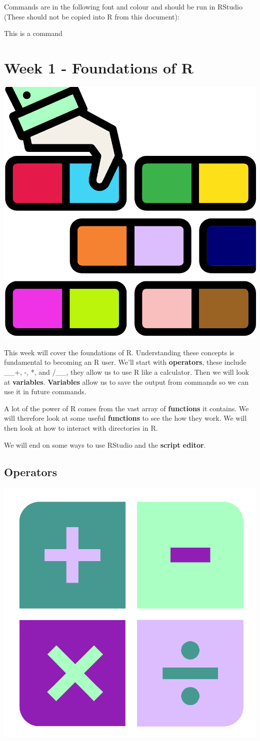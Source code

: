 \documentclass[]{book}
\newenvironment{Shaded}{\begin{snugshade}}{\end{snugshade}}
\newcommand{\NormalTok}[1]{#1}
\begin{document}
Commands are in the following font and colour and should be run in
RStudio (These should not be copied into R from this document):

\begin{Shaded}
\begin{Highlighting}[]
\NormalTok{This is a command }
\end{Highlighting}
\end{Shaded}

\chapter{Week 1 - Foundations of R}\label{week-1---foundations-of-r}

\begin{center}\includegraphics[width=0.2\linewidth]{figures/foundational} \end{center}

This week will cover the foundations of R. Understanding these concepts
is fundamental to becoming an R user. We'll start with
\textbf{operators}, these include \_\_+, -, *, and /\_\_, they allow us
to use R like a calculator. Then we will look at \textbf{variables}.
\textbf{Variables} allow us to save the output from commands so we can
use it in future commands.

A lot of the power of R comes from the vast array of \textbf{functions}
it contains. We will therefore look at some useful \textbf{functions} to
see the how they work. We will then look at how to interact with
directories in R.

We will end on some ways to use RStudio and the \textbf{script editor}.

\section{Operators}\label{operators}

\begin{center}\includegraphics[width=0.2\linewidth]{figures/calculator} \end{center}
\end{document}

